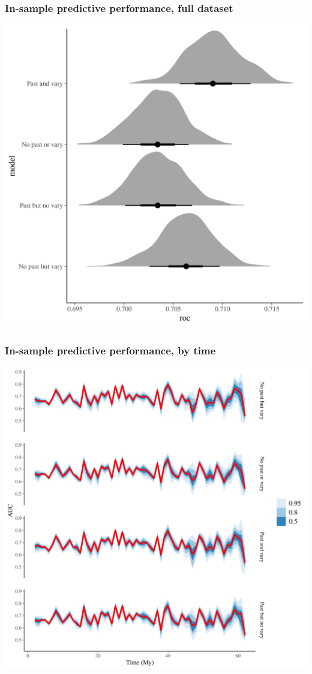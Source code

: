 \documentclass{beamer}
\begin{document}
\begin{frame}
  \frametitle{In-sample predictive performance, full dataset}
 
  \includegraphics[width=\textwidth,height=\textheight,keepaspectratio=true]{../results/figure/roc_hist}

\end{frame}


\begin{frame}
  \frametitle{In-sample predictive performance, by time}
  
  \includegraphics[width=\textwidth,height=\textheight,keepaspectratio=true]{../results/figure/roc_ts}

\end{frame}
\end{document}

